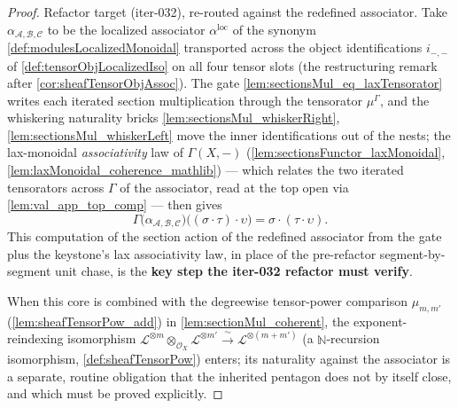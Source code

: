 \begin{proof}
  Refactor target (iter-032), re-routed against the redefined associator. Take
  \(\alpha_{\mathcal{A},\mathcal{B},\mathcal{C}}\) to be the localized associator
  \(\alpha^{\mathrm{loc}}\) of the synonym \cref{def:modulesLocalizedMonoidal}
  transported across the object identifications \(i_{-,-}\) of
  \cref{def:tensorObjLocalizedIso} on all four tensor slots (the restructuring
  remark after \cref{cor:sheafTensorObjAssoc}). The gate
  \cref{lem:sectionsMul_eq_laxTensorator} writes each iterated section
  multiplication through the tensorator \(\mu^{\Gamma}\), and the whiskering
  naturality bricks \cref{lem:sectionsMul_whiskerRight},
  \cref{lem:sectionsMul_whiskerLeft} move the inner identifications out of the
  nests; the lax-monoidal \emph{associativity} law of \(\Gamma(X,-)\)
  (\cref{lem:sectionsFunctor_laxMonoidal}, \cref{lem:laxMonoidal_coherence_mathlib})
  --- which relates the two iterated tensorators across \(\Gamma\) of the
  associator, read at the top open via \cref{lem:val_app_top_comp} --- then gives
  \[
    \Gamma\bigl(\alpha_{\mathcal{A},\mathcal{B},\mathcal{C}}\bigr)
      \bigl((\sigma \cdot \tau) \cdot \upsilon\bigr)
      = \sigma \cdot (\tau \cdot \upsilon).
  \]
  This computation of the section action of the redefined associator from the gate
  plus the keystone's lax associativity law, in place of the pre-refactor
  segment-by-segment unit chase, is the \textbf{key step the iter-032 refactor must
  verify}.

  When this core is combined with the degreewise tensor-power comparison
  \(\mu_{m,m'}\) (\cref{lem:sheafTensorPow_add}) in \cref{lem:sectionMul_coherent},
  the exponent-reindexing isomorphism \(\mathcal{L}^{\otimes m} \otimes_{\mathcal{O}_X}
  \mathcal{L}^{\otimes m'} \xrightarrow{\ \sim\ } \mathcal{L}^{\otimes (m+m')}\)
  (a \(\mathbb{N}\)-recursion isomorphism, \cref{def:sheafTensorPow}) enters; its
  naturality against the associator is a separate, routine obligation that the
  inherited pentagon does not by itself close, and which must be proved explicitly.
\end{proof}

